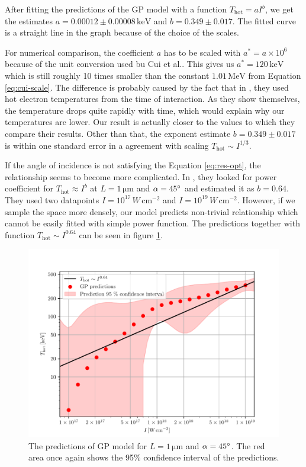 After fitting the predictions of the GP model with a function $T_{\mathrm{hot}}= aI^b$, we get the estimates $a=0.00012\pm0.00008 \, \mathrm{keV}$ and $b=0.349\pm0.017$. The fitted curve is a straight line in the graph because of the choice of the scales.

For numerical comparison, the coefficient $a$ has to be scaled with $a^* = a\times 10^6$ because of the unit conversion used bu Cui et al.. This gives us $a^* = 120 \, \mathrm{keV}$ which is still roughly 10 times smaller than the constant $1.01\, \mathrm{MeV}$ from Equation \ref{eq:cui-scale}. The difference is probably caused by the fact that in \cite{cui2013}, they used hot electron temperatures from the time of interaction. As they show themselves, the temperature drops quite rapidly with time, which would explain why our temperatures are lower. Our result is actually closer to the values to which they compare their results.
Other than that, the exponent estimate  $b=0.349\pm0.017$ is within one standard error in a agreement with scaling $T_\mathrm{hot} \sim I^{1/3}$.	



If the angle of incidence is not satisfying the Equation \ref{eq:res-opt}, the relationship seems to become more complicated. In \cite{cui2013}, they looked for power coefficient for $T_\mathrm{hot} \approx I^{b}$ at $L = 1\,\mathrm{\mu m}$ and $\alpha = 45\degree$ and estimated it as $b=0.64$. They used two datapoints $I = 10^{17} \, W \, \mathrm{cm}^{-2}$ and $I = 10^{19} \, W \, \mathrm{cm}^{-2}$. However, if we sample the space more densely, our model predicts non-trivial relationship which cannot be easily fitted with simple power function. The predictions  together with function $T_\mathrm{hot} \sim I^{0.64}$ can be seen in figure \ref{fig:cui-compare-2}.

\begin{figure}[h]
	\centering
	\includegraphics[width=0.95 \textwidth]{figures/cui_compare2}
	\caption{The predictions of GP model for $L = 1 \, \mathrm{\mu m}$ and $\alpha = 45 \degree$. The red area once again shows the 95\% confidence interval of the predictions.}
	\label{fig:cui-compare-2}
\end{figure}


